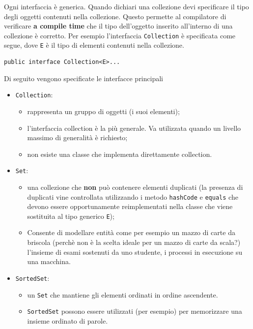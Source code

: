 \documentclass{article}
\begin{document}
Ogni interfaccia \`e generica. Quando dichiari una collezione devi specificare il tipo degli oggetti contenuti nella collezione. Questo permette al compilatore di verificare \textbf{a compile time} che il tipo dell'oggetto inserito all'interno di una collezione \`e corretto. Per esempio l'interfaccia \texttt{Collection} \`e specificata come segue, dove \texttt{E} \`e il tipo di elementi contenuti nella collezione.
\begin{lstlisting}
public interface Collection<E>...
\end{lstlisting}
Di seguito vengono specificate le interfacce principali
\begin{itemize}
\item \texttt{Collection}: 
\begin{itemize}
\item rappresenta un gruppo di oggetti (i suoi elementi);
\item l'interfaccia collection \`e la pi\`u generale. Va utilizzata quando un livello massimo di generalit\`a \`e richiesto;
\item non esiste una classe che implementa direttamente collection. 
\end{itemize}
\item \texttt{Set}: 
\begin{itemize}
\item una collezione che \textbf{non} pu\`o contenere elementi duplicati (la presenza di duplicati vine controllata utilizzando i metodo \texttt{hashCode} e \texttt{equals} che devono essere opportunamente reimplementati nella classe che viene sostituita al tipo generico \texttt{E}); 
\item Consente di modellare entit\`a come per esempio un mazzo di carte da briscola (perch\`e non \`e la scelta ideale per un mazzo di carte da scala?) l'insieme di esami sostenuti da uno studente, i processi in esecuzione su una macchina.
\end{itemize} 
\item \texttt{SortedSet}: 
\begin{itemize}
\item un \texttt{Set} che mantiene gli elementi ordinati in ordine ascendente.  
\item \texttt{SortedSet} possono essere utilizzati (per esempio) per memorizzare una insieme ordinato di parole.
\end{itemize}
\end{itemize}
\end{document}
